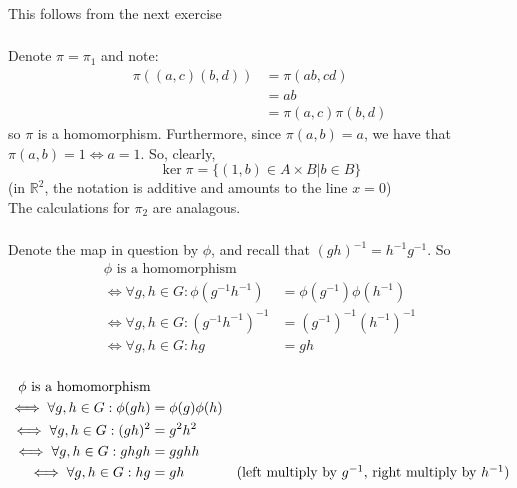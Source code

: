 \documentclass{article}
\newcommand{\reals}{\mathbb{R}}
\newcommand{\set}[1]{ \{ #1 \} }
\newcommand{\inv}[1]{ {#1}^{-1} }
\begin{document}
\subsubsection{}\label{ex6p15}
This follows from the next exercise
\subsubsection{}\label{ex6p16}
Denote $\pi = \pi_1$ and note:
\begin{align*}
\pi((a,c)(b,d)) &= \pi(ab,cd)\\
&= ab\\
&= \pi(a,c)\pi(b,d)
\end{align*}
so $\pi$ is a homomorphism. Furthermore, since $\pi(a,b) = a$, we have that\\
$\pi(a,b) = 1 \iff a = 1$. So, clearly,
\begin{equation}
\ker\pi = \set{(1,b) \in A\times B | b \in B}
\end{equation}
(in $\reals^2$, the notation is additive and amounts to the line $x=0$)\\
The calculations for $\pi_2$ are analagous.
\subsubsection{}\label{ex6p17}
Denote the map in question by $\phi$, and recall that $\inv{(gh)} = \inv{h}\inv{g}$. So
\begin{align*}
\phi \mbox{ is a homomorphism}\\
\iff \forall g,h \in G: \phi(\inv{g}\inv{h}) &= \phi(\inv{g})\phi(\inv{h})\\
\iff \forall g,h \in G: \inv{(\inv{g}\inv{h})} &= \inv{(\inv{g})}\inv{(\inv{h})}\\
\iff \forall g,h \in G: hg &= gh
\end{align*}
\subsubsection{}\label{ex6p18}
\begin{align*}
\phi \mbox{ is a homomorphism}\\
\iff \forall g,h\in G: \phi(gh) &= \phi(g)\phi(h)\\
\iff \forall g,h\in G: (gh)^2 &= g^2h^2\\
\iff \forall g,h\in G: ghgh &= gghh\\
\iff \forall g,h\in G: hg &= gh & \mbox{(left multiply by $\inv{g}$, right multiply by $\inv{h}$)}\\
\end{align*}
\end{document}
